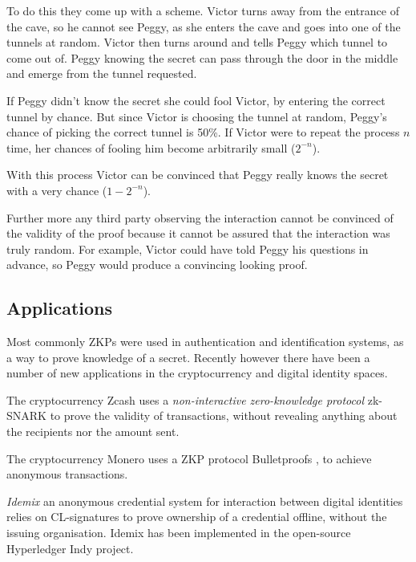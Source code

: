 \bigskip

To do this they come up with a scheme.
Victor turns away from the entrance of the cave, so he cannot see Peggy, as she enters the cave and goes into one of the tunnels at random. 
Victor then turns around and tells Peggy which tunnel to come out of.
Peggy knowing the secret can pass through the door in the middle and emerge from the tunnel requested.

\bigskip

If Peggy didn't know the secret she could fool Victor, by entering the correct tunnel by chance.
But since Victor is choosing the tunnel at random, Peggy's chance of picking the correct tunnel is 50\%. If Victor were to repeat the process $n$ time, her chances of fooling him become arbitrarily small ($2^{-n}$).

With this process Victor can be convinced that Peggy really knows the secret with a very chance ($1 - 2^{-n}$).

\bigskip

Further more any third party observing the interaction cannot be convinced of the validity of the proof because it cannot be assured that the interaction was truly random. 
For example, Victor could have told Peggy his questions in advance, so Peggy would produce a convincing looking proof.

\subsection{Applications}
Most commonly ZKPs were used in authentication and identification systems, as a way to prove knowledge of a secret. 
Recently however there have been a number of new applications in the cryptocurrency and digital identity spaces.

The cryptocurrency Zcash uses a \textit{non-interactive zero-knowledge protocol} zk-SNARK \cite{bowe2018multi} to prove the validity of transactions, without revealing anything about the recipients nor the amount sent.

The cryptocurrency Monero uses a ZKP protocol Bulletproofs \cite{bunz2018bulletproofs}, to achieve anonymous transactions.

\textit{Idemix} \cite{camenisch2002design} an anonymous credential system for interaction between digital identities relies on CL-signatures \cite{camenisch2001efficient} to prove ownership of a credential offline, without the issuing organisation.
Idemix has been implemented in the open-source Hyperledger Indy project.

